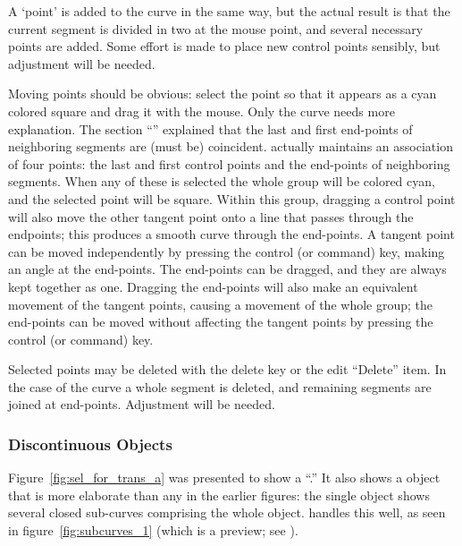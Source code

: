 			A `point' is added to the \IXbezn{} curve in the
			same way, but the actual result is that the current
			segment is divided in two at the mouse point, and
			several necessary points are added. Some effort is
			made to place new  control
			points sensibly, but adjustment will be needed.
			
			Moving points should be obvious: select the point so
			that it appears as a cyan colored square and drag it
			with the mouse. Only the \IXbezn{} curve needs more
			explanation. The section
			``'' explained
			that the last and first end-points of neighboring
			segments are (must be) coincident. \IXpkgu{}
			actually maintains an association of four points:
			the last and first  control points
			and the end-points of neighboring segments. When any
			of these is selected the whole group will be
			colored cyan, and the selected point will be square.
			Within this group, dragging a 
			control point will also move the other tangent
			point onto a line that passes through the endpoints;
			this produces a smooth curve through the end-points.
			A tangent point can be moved independently by
			pressing the control (or command) key, making
			an angle at the end-points. The end-points can
			be dragged, and they are always kept together
			as one. Dragging the end-points will also make
			an equivalent movement of the
			tangent points, causing a movement of the
			whole group; the end-points can be moved
			without affecting the tangent points by
			pressing the control (or command) key.
			
			Selected points may be deleted with the delete key
			or the edit  ``Delete'' item.
			In the case of the
			\IXbezn{} curve a whole segment is
			deleted, and remaining segments are joined at
			end-points. Adjustment will be needed.

			\subsubsection{Discontinuous Objects}%
			\label{sssec:discont_objects}
			Figure~\ref{fig:sel_for_trans_a} was presented to
			show a
			``.''
			It also shows a \IXspline{} object that is more
			elaborate than any in the earlier figures:
			the single object shows several closed sub-curves
			comprising the whole object.
			\IXpov{} handles this well, as
			seen in figure~\ref{fig:subcurves_1}
			(which is a \IXpov{} preview;
			see ).

